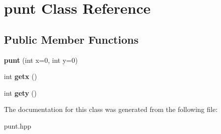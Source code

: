 \hypertarget{classpunt}{}\section{punt Class Reference}
\label{classpunt}
\subsection*{Public Member Functions}
\begin{DoxyCompactItemize}
\item 
\mbox{\label{classpunt_a9c0b4caf91ddfacf516d561ccf74a38e}} 
{\bfseries punt} (int x=0, int y=0)
\item 
\mbox{\label{classpunt_aa1cae250f29ca9b72a9de0d560ea9518}} 
int {\bfseries getx} ()
\item 
\mbox{\label{classpunt_a71869b9db737692169ed25fe04a7f935}} 
int {\bfseries gety} ()
\end{DoxyCompactItemize}


The documentation for this class was generated from the following file\+:\begin{DoxyCompactItemize}
\item 
punt.\+hpp\end{DoxyCompactItemize}
